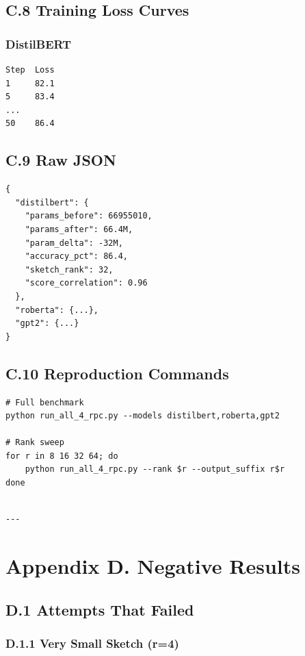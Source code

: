 \subsection{C.8 Training Loss Curves}

\subsubsection{DistilBERT}
\begin{lstlisting}
Step  Loss
1     82.1
5     83.4
...
50    86.4
\end{lstlisting}

\subsection{C.9 Raw JSON}

\begin{lstlisting}
{
  "distilbert": {
    "params_before": 66955010,
    "params_after": 66.4M,
    "param_delta": -32M,
    "accuracy_pct": 86.4,
    "sketch_rank": 32,
    "score_correlation": 0.96
  },
  "roberta": {...},
  "gpt2": {...}
}
\end{lstlisting}

\subsection{C.10 Reproduction Commands}

\begin{lstlisting}
# Full benchmark
python run_all_4_rpc.py --models distilbert,roberta,gpt2

# Rank sweep
for r in 8 16 32 64; do
    python run_all_4_rpc.py --rank $r --output_suffix r$r
done
\end{lstlisting}
\begin{lstlisting}

---
\end{lstlisting}


\section{Appendix D. Negative Results}

\subsection{D.1 Attempts That Failed}

\subsubsection{D.1.1 Very Small Sketch (r=4)}

